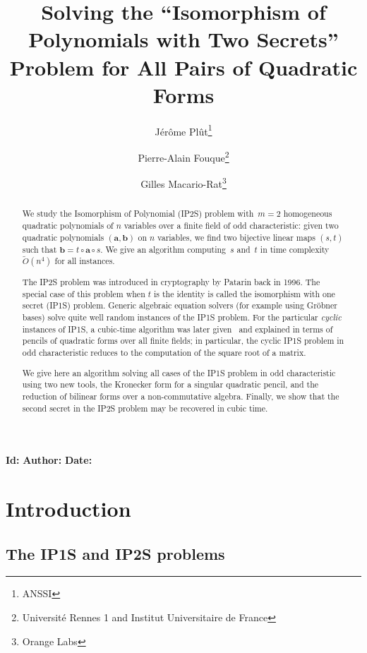 \documentclass{article}%
\def\Ot{\widetilde{O}}
\def\gitkw$#1:#2${{\small \textbf{#1: }\texttt{#2}}}
\begin{document}
\title%
{Solving the ``Isomorphism of Polynomials with Two Secrets'' Problem
for All Pairs of Quadratic Forms}%
\author{Jérôme Plût\footnote{ANSSI}
\and Pierre-Alain Fouque\footnote{Université Rennes 1 and Institut
Universitaire de France}
\and Gilles Macario-Rat\footnote{Orange Labs}}
\maketitle

\centerline{\gitkw $Id:$
\gitkw $Author:$
\gitkw $Date:$}

\begin{abstract}%
We study the Isomorphism of Polynomial (IP2S) problem
with~$m=2$ homogeneous quadratic polynomials of $n$ variables over a finite field of odd
characteristic: given two quadratic polynomials $(\bm{a},\bm{b})$ 
on $n$ variables, we find two bijective linear maps $(s,t)$ such that
$\bm{b}=t\circ \bm{a}\circ s$. We give an algorithm computing~$s$ and~$t$
in time complexity~$\Ot(n^4)$ for all instances.

The IP2S problem was introduced in cryptography by Patarin back in 1996.
The special case of this problem when $t$ is the identity is called
the isomorphism with one secret (IP1S) problem.
Generic algebraic equation solvers (for example using Gröbner bases)
solve quite well random instances of the IP1S problem. For the particular
\emph{cyclic} instances of IP1S, a cubic-time algorithm was later
given~\cite{MPG2013} and explained in terms of pencils of quadratic forms
over all finite fields; in particular, the cyclic IP1S problem in odd
characteristic reduces to the computation of the square root of a matrix.

We give here an algorithm solving all cases of the IP1S problem in odd
characteristic using two new tools, the Kronecker form for a singular
quadratic pencil, and the reduction of bilinear forms over a non-commutative
algebra. Finally, we show that the second secret in the IP2S problem may
be recovered in cubic time.
\end{abstract}%
\section*{Introduction}%
\subsection*{The IP1S and IP2S problems}%
\end{document}
